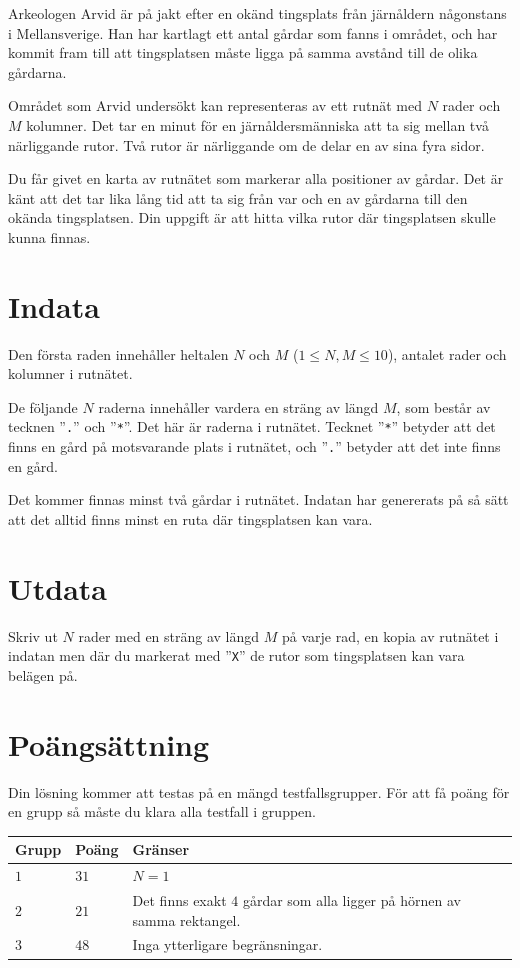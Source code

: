 
Arkeologen Arvid är på jakt efter en okänd tingsplats från järnåldern någonstans i Mellansverige.
Han har kartlagt ett antal gårdar som fanns i området, och har kommit fram till att tingsplatsen måste ligga på samma avstånd till de olika gårdarna.

Området som Arvid undersökt kan representeras av ett rutnät med $N$ rader och $M$ kolumner.
Det tar en minut för en järnåldersmänniska att ta sig mellan två närliggande rutor.
Två rutor är närliggande om de delar en av sina fyra sidor.

Du får givet en karta av rutnätet som markerar alla positioner av gårdar.
Det är känt att det tar lika lång tid att ta sig från var och en av gårdarna till den okända tingsplatsen.
Din uppgift är att hitta vilka rutor där tingsplatsen skulle kunna finnas.

\section*{Indata}
Den första raden innehåller heltalen $N$ och $M$ ($1 \leq N,M \leq 10$), antalet rader och kolumner i rutnätet.

De följande $N$ raderna innehåller vardera en sträng av längd $M$, som består av tecknen ''\verb|.|'' och ''\verb|*|''.
Det här är raderna i rutnätet.
Tecknet ''\verb|*|'' betyder att det finns en gård på motsvarande plats i rutnätet, och ''\verb|.|'' betyder att det inte finns en gård.

Det kommer finnas minst två gårdar i rutnätet.
Indatan har genererats på så sätt att det alltid finns minst en ruta där tingsplatsen kan vara.

\section*{Utdata}
Skriv ut $N$ rader med en sträng av längd $M$ på varje rad, en kopia av rutnätet i indatan men där du markerat med ''\verb|X|'' de rutor som tingsplatsen kan vara belägen på.

\section*{Poängsättning}
Din lösning kommer att testas på en mängd testfallsgrupper.
För att få poäng för en grupp så måste du klara alla testfall i gruppen.


\noindent
\begin{tabular}{| l | l | p{12cm} |}
  \hline
  \textbf{Grupp} & \textbf{Poäng} & \textbf{Gränser} \\ \hline
  $1$      & $31$      & $N = 1$ \\ \hline
  $2$      & $21$      & Det finns exakt $4$ gårdar som alla ligger på hörnen av samma rektangel. \\ \hline
  $3$      & $48$      & Inga ytterligare begränsningar. \\ \hline
\end{tabular}


